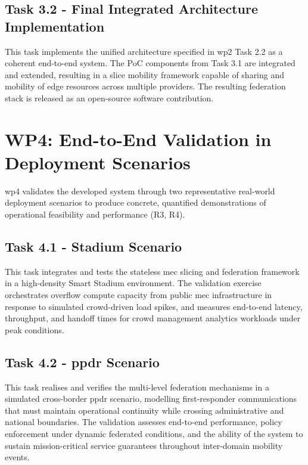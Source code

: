 \subsection{Task 3.2 - Final Integrated Architecture Implementation}

This task implements the unified architecture specified in \ac{wp}2 Task 2.2 as a coherent end-to-end system. The PoC components from Task 3.1 are integrated and extended, resulting in a slice mobility framework capable of sharing and mobility of edge resources across multiple providers. The resulting federation stack is released as an open-source software contribution.

\section{WP4: End-to-End Validation in Deployment Scenarios}

\ac{wp}4 validates the developed system through two representative real-world deployment scenarios to produce concrete, quantified demonstrations of operational feasibility and performance (R3, R4).

\subsection{Task 4.1 - Stadium Scenario}

This task integrates and tests the stateless \ac{mec} slicing and federation framework in a high-density Smart Stadium environment. The validation exercise orchestrates overflow compute capacity from public \ac{mec} infrastructure in response to simulated crowd-driven load spikes, and measures end-to-end latency, throughput, and handoff times for crowd management analytics workloads under peak conditions.

\subsection{Task 4.2 - \ac{ppdr} Scenario}

This task realises and verifies the multi-level federation mechanisms in a simulated cross-border \ac{ppdr} scenario, modelling first-responder communications that must maintain operational continuity while crossing administrative and national boundaries. The validation assesses end-to-end performance, policy enforcement under dynamic federated conditions, and the ability of the system to sustain mission-critical service guarantees throughout inter-domain mobility events.

